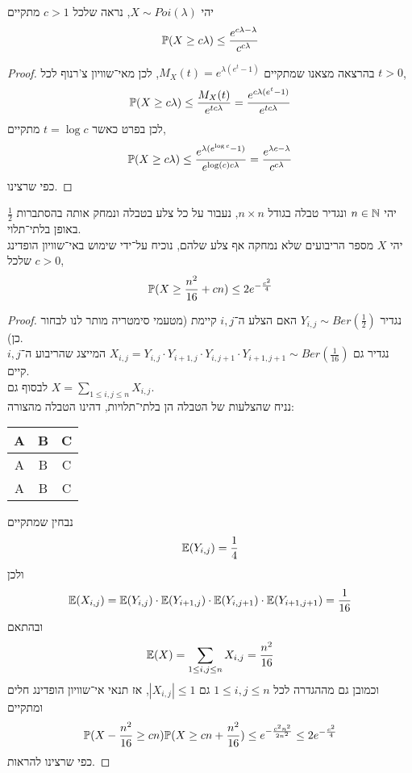 \question{}
יהי $X \sim Poi(\lambda)$,
נראה שלכל $c > 1$ מתקיים
\[
	\mathbb{P}(X \ge c \lambda)
	\le \frac{e^{c\lambda - \lambda}}{c^{c\lambda}}
\]
\begin{proof}
	בהרצאה מצאנו שמתקיים $M_X(t) = e^{\lambda(e^t - 1)}$, לכן מאי־שוויון צ'רנוף לכל $t > 0$,
	\[
		\mathbb{P}(X \ge c \lambda)
		\le \frac{M_X(t)}{e^{t c \lambda}}
		= \frac{e^{c\lambda (e^t - 1)}}{e^{t c \lambda}}
	\]
	לכן בפרט כאשר $t = \log c$ מתקיים,
	\[
		\mathbb{P}(X \ge c \lambda)
		\le \frac{e^{\lambda (e^{\log c} - 1)}}{e^{\log(c) c \lambda}}
		= \frac{e^{\lambda c - \lambda}}{c^{c \lambda}}
	\]
	כפי שרצינו.
\end{proof}

\question{}
יהי $n \in \mathbb{N}$ ונגדיר טבלה בגודל $n \times n$, נעבור על כל צלע בטבלה ונמחק אותה בהסתברות $\frac{1}{2}$ באופן בלתי־תלוי. \\
יהי $X$ מספר הריבועים שלא נמחקה אף צלע שלהם, נוכיח על־ידי שימוש באי־שוויון הופדינג שלכל $c > 0$,
\[
	\mathbb{P}(X \ge \frac{n^2}{16} + cn) \le 2 e^{-\frac{c^2}{4}}
\]
\begin{proof}
	נגדיר $Y_{i, j} \sim Ber(\frac{1}{2})$ האם הצלע ה־$i, j$ קיימת (מטעמי סימטריה מותר לנו לבחור כן). \\
	נגדיר גם $X_{i, j} = Y_{i, j} \cdot Y_{i + 1, j} \cdot Y_{i, j + 1} \cdot Y_{i + 1, j + 1} \sim Ber(\frac{1}{16})$ המייצג שהריבוע ה־$i, j$ קיים. \\
	לבסוף גם $X = \sum_{1 \le i, j \le n} X_{i, j}$. \\
	נניח שהצלעות של הטבלה הן בלתי־תלויות, דהינו הטבלה מהצורה:
	\begin{center}
		\begin{tabular}{||c || c || c ||}
			\hline\hline
			A & B & C \\
			\hline\hline
			A & B & C \\
			\hline\hline
			A & B & C \\
			\hline\hline
		\end{tabular}
	\end{center}
	נבחין שמתקיים
	\[
		\mathbb{E}(Y_{i, j}) = \frac{1}{4}
	\]
	ולכן
	\[
		\mathbb{E}(X_{i, j})
		= \mathbb{E}(Y_{i, j}) \cdot \mathbb{E}(Y_{i + 1, j}) \cdot \mathbb{E}(Y_{i, j + 1}) \cdot \mathbb{E}(Y_{i + 1, j + 1})
		= \frac{1}{16}
	\]
	ובהתאם
	\[
		\mathbb{E}(X)
		= \sum_{1 \le i, j \le n} X_{i, j}
		= \frac{n^2}{16}
	\]
	וכמובן גם מההגדרה לכל $1 \le i, j \le n$ גם $|X_{i, j}| \le 1$, אז תנאי אי־שוויון הופדינג חלים ומתקיים
	\[
		\mathbb{P}(X - \frac{n^2}{16} \ge cn)
		\mathbb{P}(X \ge cn + \frac{n^2}{16})
		\le e^{-\frac{c^2 n^2}{2 n^2}}
		\le 2e^{-\frac{c^2}{4}}
	\]
	כפי שרצינו להראות.
\end{proof}

